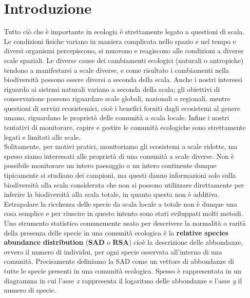 \chapter*{Introduzione}
Tutto ciò che è importante in ecologia è strettamente legato a questioni di scala. Le condizioni fisiche variano in maniera complicata nello spazio e nel tempo e diversi organismi percepiscono, si muovono e reagiscono alle condizioni a diverse scale spaziali. 
Le diverse cause dei cambiamenti ecologici (naturali o antropiche) tendono a manifestarsi a scale diverse, e come risultato i cambiamenti nella biodiversità possono essere diversi a seconda della scala. Anche i nostri interessi riguardo ai sistemi naturali variano a seconda della scala; gli obiettivi di conservazione possono riguardare scale globali, nazionali o regionali, mentre questioni di servizi ecosistemici, cioè i benefici forniti dagli ecosistemi al genere umano, riguardano le proprietà delle comunità a scala locale. Infine i nostri tentativi di monitorare, capire e gestire le comunità ecologiche sono strettamente legati e limitati alle scale.\\
Solitamente, per motivi pratici, monitoriamo gli ecosistemi a scale ridotte, ma spesso siamo interessati alle proprietà di una comunità a scale diverse. 
Non è possibile monitorare un intero paesaggio o un intero continente dunque tipicamente si studiano dei campioni, ma questi danno informazioni solo sulla biodiversità alla scala considerata che non si possono utilizzare direttamente per inferire la biodiversità alla scala totale, in quanto questa non è additiva. Estrapolare la ricchezza delle specie da scala locale a totale non è dunque una cosa semplice e per riuscire in questo intento sono stati sviluppati molti metodi.\\
Uno strumento statistico comunemente usato per descrivere la normalità o rarità della presenza delle specie in una comunità ecologica è la \textbf{relative species abundance distribution} (\textbf{SAD} o \textbf{RSA}) cioè la descrizione delle abbondanze, ovvero il numero di individui, per ogni specie osservata all'interno di una comunità. Precisamente definiamo la SAD come un vettore di abbondanze di tutte le specie presenti in una comunità ecologica. Spesso è rappresentata in un diagramma in cui l'asse \emph{x} rappresenta il logaritmo delle abbondanze e l'asse \emph{y} il numero di specie.


